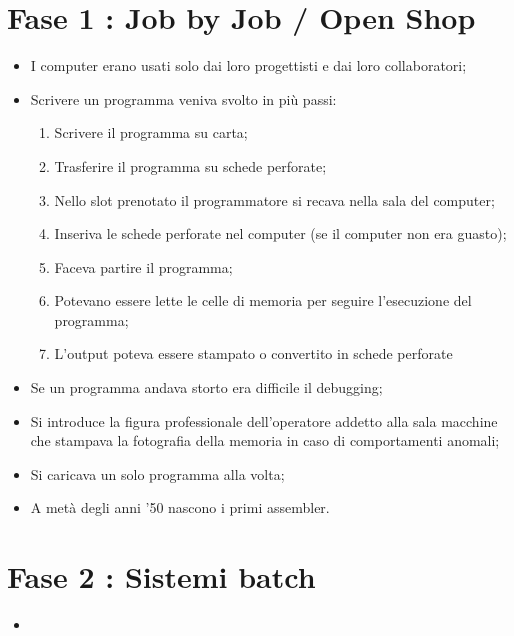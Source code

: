 \section{Fase 1 : Job by Job / Open Shop}
\begin{itemize}
    \item I computer erano usati solo dai loro progettisti e dai loro collaboratori;
    \item Scrivere un programma veniva svolto in più passi:
    \begin{enumerate}
        \item Scrivere il programma su carta;
        \item Trasferire il programma su schede perforate;
        \item Nello slot prenotato il programmatore si recava nella sala del computer;
        \item Inseriva le schede perforate nel computer (se il computer non era guasto);
        \item Faceva partire il programma;
        \item Potevano essere lette le celle di memoria per seguire l'esecuzione del programma;
        \item L'output poteva essere stampato o convertito in schede perforate
    \end{enumerate}
    \item Se un programma andava storto era difficile il debugging;
    \item Si introduce la figura professionale dell'operatore addetto alla sala macchine
    che stampava la fotografia della memoria in caso di comportamenti anomali;
    \item Si caricava un solo programma alla volta;
    \item A metà degli anni '50 nascono i primi assembler.
\end{itemize}

\section{Fase 2 : Sistemi batch}

\begin{itemize}
    \item 
\end{itemize}